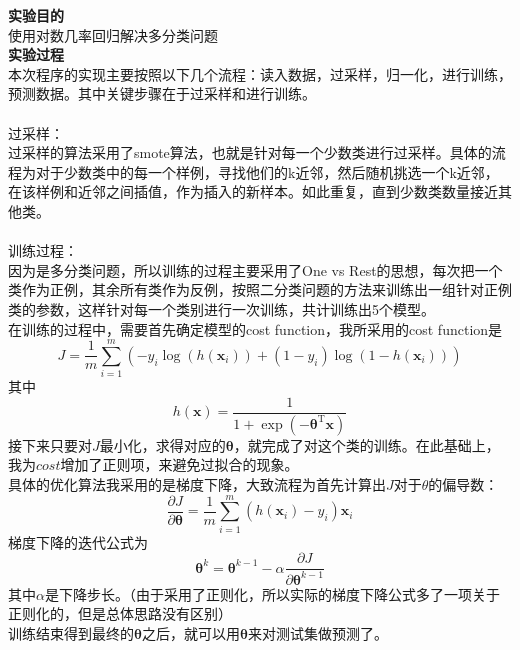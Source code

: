 \documentclass[a4paper,UTF8]{article}
\numberwithin{equation}{section}
\begin{document}
\noindent\textbf{实验目的}\\
使用对数几率回归解决多分类问题\\

\noindent\textbf{实验过程}\\
本次程序的实现主要按照以下几个流程：读入数据，过采样，归一化，进行训练，预测数据。其中关键步骤在于过采样和进行训练。\\\\
过采样：\\
过采样的算法采用了smote算法，也就是针对每一个少数类进行过采样。具体的流程为对于少数类中的每一个样例，寻找他们的k近邻，然后随机挑选一个k近邻，在该样例和近邻之间插值，作为插入的新样本。如此重复，直到少数类数量接近其他类。\\\\
训练过程：\\
因为是多分类问题，所以训练的过程主要采用了One vs Rest的思想，每次把一个类作为正例，其余所有类作为反例，按照二分类问题的方法来训练出一组针对正例类的参数，这样针对每一个类别进行一次训练，共计训练出5个模型。\\
在训练的过程中，需要首先确定模型的cost function，我所采用的cost function是
\begin{equation}
J = \frac{1}{m}\sum_{i=1}^{m}(-y_i\log(h(\mathbf{x}_i)) + (1-y_i)\log(1-h(\mathbf{x}_i)))
\end{equation}
其中
\begin{equation}
h(\mathbf{x}) = \frac{1}{1 + \exp(-\boldsymbol{\theta}^\mathrm{T}\mathbf{x})}
\end{equation}
接下来只要对$J$最小化，求得对应的$\boldsymbol{\theta}$，就完成了对这个类的训练。在此基础上，我为$cost$增加了正则项，来避免过拟合的现象。\\
具体的优化算法我采用的是梯度下降，大致流程为首先计算出$J$对于$\theta$的偏导数：
\begin{equation}
\frac{\partial J}{\partial \boldsymbol{\theta}} = \frac{1}{m}\sum_{i=1}^{m}(h(\mathbf{x}_i )- y_i)\mathbf{x}_i
\end{equation}
梯度下降的迭代公式为
\begin{equation}
\boldsymbol{\theta}^k = \boldsymbol{\theta}^{k-1} - \alpha\frac{\partial J}{\partial \boldsymbol{\theta}^{k-1}}
\end{equation}
其中$\alpha$是下降步长。（由于采用了正则化，所以实际的梯度下降公式多了一项关于正则化的，但是总体思路没有区别）\\
训练结束得到最终的$\boldsymbol{\theta}$之后，就可以用$\boldsymbol{\theta}$来对测试集做预测了。\\\\
\end{document}

